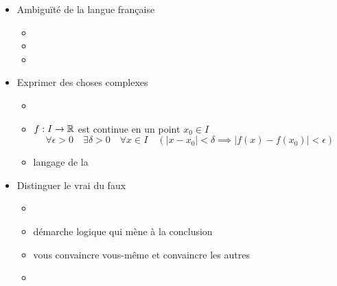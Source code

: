 \begin{frame}

\begin{itemize}
  \item Ambigu\"ité de la langue française
     \begin{itemize}
        \item {}
        \item {}
 
\pause

        \item {}
     \end{itemize}

        
\pause      
\bigskip

  \item Exprimer des choses complexes
     \begin{itemize}
        \item {}

\pause

        \item $f : I \to \mathbb{R}$ est continue en un point $x_0\in I$
$$\forall \epsilon > 0 \quad \exists \delta >0 \quad \forall x \in I \quad 
  (|x-x_0|<\delta \implies |f(x)-f(x_0)|< \epsilon)$$

\pause

        \item langage de la 
     \end{itemize}

\pause
\bigskip

  \item Distinguer le vrai du faux
     \begin{itemize}
        \item {}

\pause

        \item démarche logique qui mène à la conclusion
        \item vous convaincre vous-même et convaincre les autres

\pause

        \item {}
     \end{itemize}
\end{itemize}

\end{frame}




